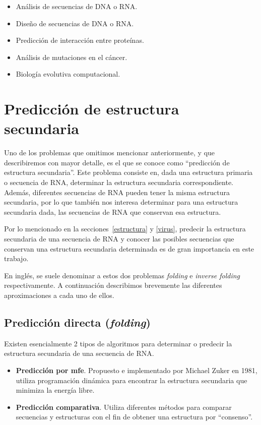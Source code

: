 \begin{itemize}
 \item An\'alisis de secuencias de \ac{DNA} o \ac{RNA}.
 \item Dise\~no de secuencias de \ac{DNA} o \ac{RNA}.
 \item Predicci\'on de interacci\'on entre prote\'inas.
 \item An\'alisis de mutaciones en el c\'ancer.
 \item Biolog\'ia evolutiva computacional.
\end{itemize}

\section{Predicci\'on de estructura secundaria}

Uno de los problemas que omitimos mencionar anteriormente, y que describiremos
con mayor detalle, es el que se conoce como ``predicci\'on de estructura
secundaria''. Este problema consiste en, dada una estructura primaria o
secuencia de \ac{RNA}, determinar la estructura secundaria correspondiente.
Adem\'as, diferentes secuencias de \ac{RNA} pueden tener la misma estructura
secundaria, por lo que tambi\'en nos interesa determinar para una estructura
secundaria dada, las secuencias de \ac{RNA} que conservan esa estructura.
 
Por lo mencionado en la secciones~\ref{estructura} y \ref{virus}, predecir la
estructura secundaria de una secuencia de \ac{RNA} y conocer las posibles
secuencias que conservan una estructura secundaria determinada es de gran
importancia en este trabajo.

En ingl\'es, se suele denominar a estos dos problemas \textit{folding} e
\textit{inverse folding} respectivamente. A continuaci\'on describimos
brevemente las diferentes aproximaciones a cada uno de ellos.

\subsection{Predicci\'on directa (\textit{folding})}
\label{folding}
Existen esencialmente 2 tipos de algoritmos para determinar o predecir la
estructura secundaria de una secuencia de \ac{RNA}.

\begin{itemize} 
 \item \textbf{Predicci\'on por \ac{mfe}}. Propuesto e implementado por Michael
Zuker en 1981\cite{Zuker81}, utiliza programaci\'on din\'amica para encontrar la
estructura secundaria que minimiza la energ\'ia libre.
 \item \textbf{Predicci\'on comparativa}. Utiliza diferentes m\'etodos para
comparar secuencias y estructuras con el fin de obtener una estructura por
``consenso''\cite{Gardner04}.
\end{itemize}

